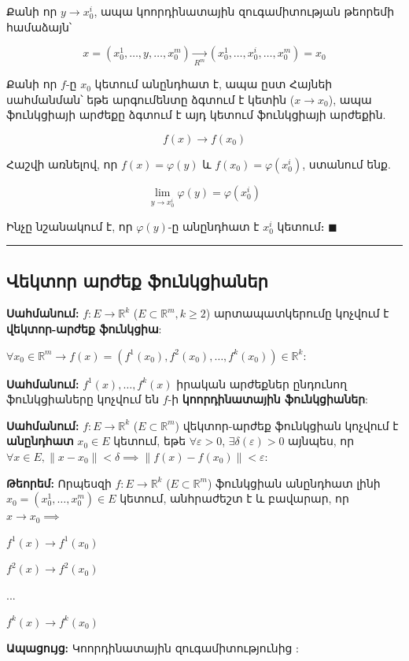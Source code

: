 \documentclass[12pt, a4paper]{article}
\begin{document}
Քանի որ $y \to x_0^i$, ապա կոորդինատային զուգամիտության թեորեմի համաձայն՝

$$
x = (x_0^1, \dots, y, \dots, x_0^m) \xrightarrow[R^m]{} (x_0^1, \dots, x_0^i, \dots, x_0^m) = x_0
$$

Քանի որ $f$-ը $x_0$ կետում անընդհատ է, ապա ըստ Հայնեի սահմանման՝ եթե արգումենտը ձգտում է կետին ($x \to x_0$), ապա ֆունկցիայի արժեքը ձգտում է այդ կետում ֆունկցիայի արժեքին.

$$
f(x) \to f(x_0)
$$

Հաշվի առնելով, որ $f(x) = \varphi(y)$ և $f(x_0) = \varphi(x_0^i)$, ստանում ենք.

$$
\lim_{y \to x_0^i} \varphi(y) = \varphi(x_0^i)
$$

Ինչը նշանակում է, որ $\varphi(y)$-ը անընդհատ է $x_0^i$ կետում։ $\blacksquare$

\vspace{1em}
\hrule
\vspace{1em}

\subsection{Վեկտոր արժեք ֆունկցիաներ}

\textbf{Սահմանում:} $f: E \to \mathbb{R}^k$ ($E \subset \mathbb{R}^m, k \ge 2$) արտապատկերումը կոչվում է \textbf{վեկտոր-արժեք ֆունկցիա}:

$\forall x_0 \in \mathbb{R}^m \to f(x) = (f^1(x_0), f^2(x_0), \dots, f^k(x_0)) \in \mathbb{R}^k$:

\textbf{Սահմանում:} $f^1(x), \dots, f^k(x)$ իրական արժեքներ ընդունող ֆունկցիաները կոչվում են $f$-ի \textbf{կոորդինատային ֆունկցիաներ}:

\textbf{Սահմանում:} $f: E \to \mathbb{R}^k$ ($E \subset \mathbb{R}^m$) վեկտոր-արժեք ֆունկցիան կոչվում է \textbf{անընդհատ} $x_0 \in E$ կետում, եթե $\forall \varepsilon > 0$, $\exists \delta(\varepsilon) > 0$ այնպես, որ $\forall x \in E, \|x - x_0\| < \delta \implies \|f(x) - f(x_0)\| < \varepsilon$:

\textbf{Թեորեմ:} Որպեսզի $f: E \to \mathbb{R}^k$ ($E \subset \mathbb{R}^m$) ֆունկցիան անընդհատ լինի $x_0 = (x_0^1, \dots, x_0^m) \in E$ կետում, անհրաժեշտ է և բավարար, որ $x \to x_0 \implies$

$f^1(x) \to f^1(x_0)$

$f^2(x) \to f^2(x_0)$

...

$f^k(x) \to f^k(x_0)$

\textbf{Ապացույց:} Կոորդինատային զուգամիտությունից :
\end{document}
